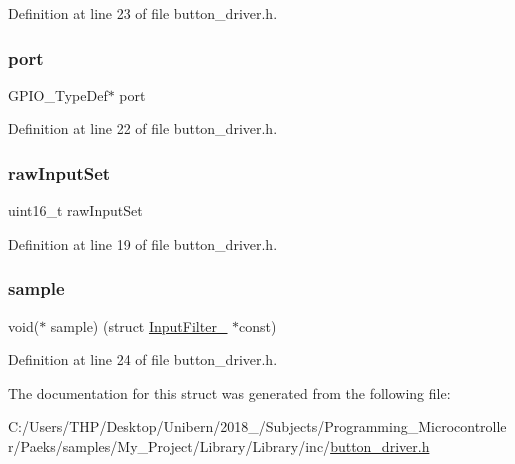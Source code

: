 Definition at line 23 of file button\+\_\+driver.\+h.

\mbox{\label{struct_input_filter___a82241972e0292c7de95ea1e293e11be3}} 
\subsubsection{\texorpdfstring{port}{port}}
{\footnotesize\ttfamily G\+P\+I\+O\+\_\+\+Type\+Def$\ast$ port}



Definition at line 22 of file button\+\_\+driver.\+h.

\mbox{\label{struct_input_filter___a295d2f6601495531b475a5965dd36c4b}} 
\subsubsection{\texorpdfstring{raw\+Input\+Set}{rawInputSet}}
{\footnotesize\ttfamily uint16\+\_\+t raw\+Input\+Set}



Definition at line 19 of file button\+\_\+driver.\+h.

\mbox{\label{struct_input_filter___aa2061c47d432d006a5b91e831536710a}} 
\subsubsection{\texorpdfstring{sample}{sample}}
{\footnotesize\ttfamily void($\ast$ sample) (struct \mbox{\hyperlink{struct_input_filter__}{Input\+Filter\+\_\+}} $\ast$const)}



Definition at line 24 of file button\+\_\+driver.\+h.



The documentation for this struct was generated from the following file\+:\begin{DoxyCompactItemize}
\item 
C\+:/\+Users/\+T\+H\+P/\+Desktop/\+Unibern/2018\+\_/\+Subjects/\+Programming\+\_\+\+Microcontroller/\+Paeks/samples/\+My\+\_\+\+Project/\+Library/\+Library/inc/\mbox{\hyperlink{button__driver_8h}{button\+\_\+driver.\+h}}\end{DoxyCompactItemize}
